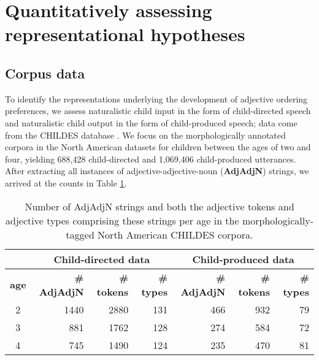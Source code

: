 \documentclass[10pt]{article}
\newcommand{\gkb}[1]{\textcolor{magenta}{[gkb: #1]}}
\newcommand{\lsp}[1]{\textcolor{violet}{[lsp: #1]}}
\begin{document}


\section{Quantitatively assessing representational hypotheses}

\subsection{Corpus data}

To identify the representations underlying the development of adjective ordering preferences, we assess naturalistic child input in the form of child-directed speech and naturalistic child output in the form of child-produced speech; data come from the CHILDES database \cite{macwhinney2000childes}.
We focus on the morphologically annotated corpora in the North American datasets for children between the ages of two and four, yielding 
 688,428 child-directed and 1,069,406 child-produced utterances. 
After extracting all instances of adjective-adjective-noun (\textbf{AdjAdjN}) strings, 
we arrived at the counts in Table \ref{counts}.

\begin{table}[!ht]
\centering
\begin{tabular}{c | r | r | r || r | r | r |}
\cline{2-7}
& \multicolumn{3}{c||}{\textbf{Child-directed data}} & \multicolumn{3}{c|}{\textbf{Child-produced data}} \\
\hline
{\textbf{age}} & {\textbf{\# AdjAdjN}} & {\textbf{\# tokens}} & {\textbf{\# types}} &{\textbf{\# AdjAdjN}} & {\textbf{\# tokens}} & {\textbf{\# types}} \\ 
\hline
2 & 1440 & 2880 & 131
& 466 & 932 & 79 \\
\hline
3 & 881 & 1762 & 128 
& 274 & 584 & 72 \\
\hline
4 & 745 & 1490 & 124
& 235 & 470 & 81 \\
\hline
\end{tabular}
\caption{
Number of AdjAdjN strings and both the adjective tokens and adjective types comprising these strings per age in the morphologically-tagged North American CHILDES corpora.
} \label{counts}
\end{table}
\end{document}
